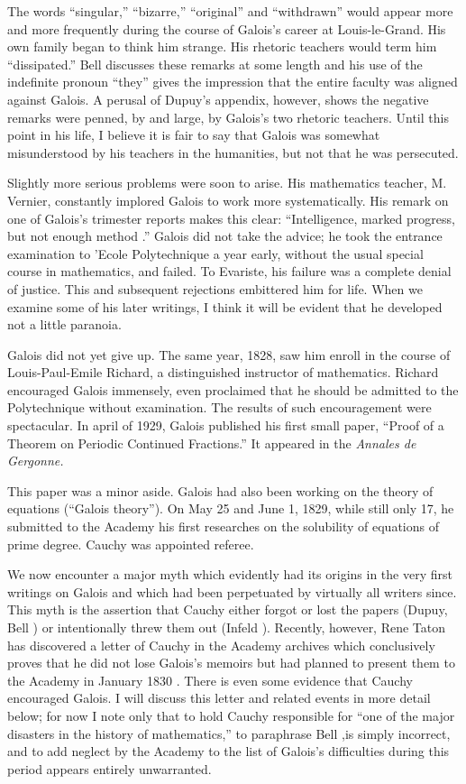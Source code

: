 \documentclass[12pt]{article}
\begin{document}
The words ``singular,'' ``bizarre,'' ``original'' and ``withdrawn'' would appear more and more frequently during the course of Galois's career at Louis-le-Grand. His own family began to think him strange. His rhetoric teachers would term him ``dissipated.'' Bell discusses these remarks at some length and his use of the indefinite pronoun ``they'' gives the impression that the entire faculty was aligned against Galois. A perusal of Dupuy's appendix, however, shows the negative remarks were penned, by and large, by Galois's two rhetoric teachers. Until this point in his life, I believe it is fair to say that Galois was somewhat misunderstood by his teachers in the humanities, but not that he was persecuted.

Slightly more serious problems were soon to arise. His mathematics teacher, M. Vernier, constantly implored Galois to work more systematically. His remark on one of Galois's trimester reports makes this clear: ``Intelligence, marked progress, but not enough method \cite{20}.'' Galois did not take the advice; he took the entrance examination to 'Ecole Polytechnique a year early, without the usual special course in mathematics, and failed. To Evariste, his failure was a complete denial of justice. This and subsequent rejections embittered him for life. When we examine some of his later writings, I think it will be evident that he developed not a little paranoia.

Galois did not yet give up. The same year, 1828, saw him enroll in the course of Louis-Paul-Emile Richard, a distinguished instructor of mathematics. Richard encouraged Galois immensely, even proclaimed that he should be admitted to the Polytechnique without examination. The results of such encouragement were spectacular. In april of 1929, Galois published his first small paper, ``Proof of a Theorem on Periodic Continued Fractions.'' It appeared in the {\it Annales de Gergonne.}

This paper was a minor aside. Galois had also been working on the theory of equations (``Galois theory''). On May 25 and June 1, 1829, while still only 17, he submitted to the Academy his first researches on the solubility of equations of prime degree. Cauchy was appointed referee.

We now encounter a major myth which evidently had its origins in the very first writings on Galois and which had been perpetuated by virtually all writers since. This myth is the assertion that Cauchy either forgot or lost the papers (Dupuy, Bell \cite{21}) or intentionally threw them out (Infeld \cite{22}). Recently, however, Rene Taton has discovered a letter of Cauchy in the Academy archives which conclusively proves that he did not lose Galois's memoirs but had planned to present them to the Academy in January 1830 \cite{23}. There is even some evidence that Cauchy encouraged Galois. I will discuss this letter and related events in more detail below; for now I note only that to hold Cauchy responsible for ``one of the major disasters in the history of mathematics,'' to paraphrase Bell \cite{24},is simply incorrect, and to add neglect by the Academy to the list of Galois's difficulties during this period appears entirely unwarranted.
\end{document}
